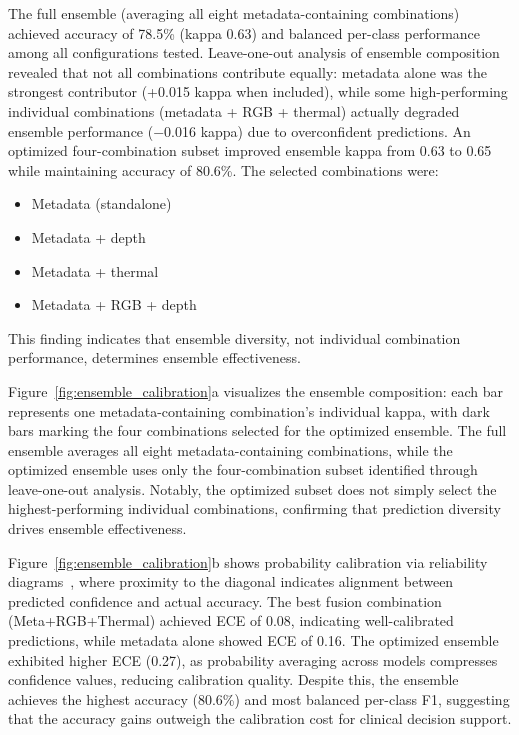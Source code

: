 \documentclass[journal,twoside,web]{ieeecolor}
\begin{document}
The full ensemble (averaging all eight metadata\nobreakdash-containing combinations) achieved accuracy of 78.5\% (kappa 0.63) and balanced per\nobreakdash-class performance among all configurations tested. Leave\nobreakdash-one\nobreakdash-out analysis of ensemble composition revealed that not all combinations contribute equally: metadata alone was the strongest contributor (+0.015 kappa when included), while some high\nobreakdash-performing individual combinations (metadata + RGB + thermal) actually degraded ensemble performance ($-$0.016 kappa) due to overconfident predictions. An optimized four\nobreakdash-combination subset improved ensemble kappa from 0.63 to 0.65 while maintaining accuracy of 80.6\%. The selected combinations were:
\begin{itemize}
\item Metadata (standalone)
\item Metadata + depth
\item Metadata + thermal
\item Metadata + RGB + depth
\end{itemize}
This finding indicates that ensemble diversity, not individual combination performance, determines ensemble effectiveness.

Figure~\ref{fig:ensemble_calibration}a visualizes the ensemble composition: each bar represents one metadata\nobreakdash-containing combination's individual kappa, with dark bars marking the four combinations selected for the optimized ensemble. The full ensemble averages all eight metadata\nobreakdash-containing combinations, while the optimized ensemble uses only the four\nobreakdash-combination subset identified through leave\nobreakdash-one\nobreakdash-out analysis. Notably, the optimized subset does not simply select the highest\nobreakdash-performing individual combinations, confirming that prediction diversity drives ensemble effectiveness.

Figure~\ref{fig:ensemble_calibration}b shows probability calibration via reliability diagrams~\cite{guo2017calibration}, where proximity to the diagonal indicates alignment between predicted confidence and actual accuracy. The best fusion combination (Meta+RGB+Thermal) achieved ECE of 0.08, indicating well\nobreakdash-calibrated predictions, while metadata alone showed ECE of 0.16. The optimized ensemble exhibited higher ECE (0.27), as probability averaging across models compresses confidence values, reducing calibration quality. Despite this, the ensemble achieves the highest accuracy (80.6\%) and most balanced per\nobreakdash-class F1, suggesting that the accuracy gains outweigh the calibration cost for clinical decision support.
\end{document}
